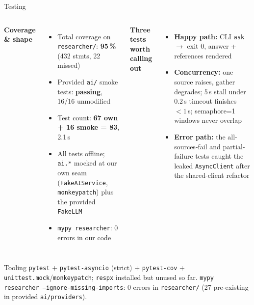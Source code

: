 \documentclass[aspectratio=169,11pt]{beamer}
\begin{document}
\begin{frame}{Testing}
  \begin{columns}[T,onlytextwidth]
  \textbf{Coverage \& shape}
  \begin{itemize}\setlength\itemsep{0.3em}
    \item Total coverage on \texttt{researcher/}: \textbf{95\,\%} (432 stmts, 22 missed)
    \item Provided \texttt{ai/} smoke tests: \textcolor{ok}{\textbf{passing}}, 16/16 unmodified
    \item Test count: \textbf{67 own + 16 smoke = 83}, 2.1\,s
    \item All tests offline; \texttt{ai.*} mocked at our own seam (\texttt{FakeAIService}, \texttt{monkeypatch}) plus the provided \texttt{FakeLLM}
    \item \texttt{mypy researcher}: 0 errors in our code
  \end{itemize}

  \textbf{Three tests worth calling out}
  \begin{itemize}\setlength\itemsep{0.3em}
    \item \textbf{Happy path:} CLI \texttt{ask} $\to$ exit 0, answer + references rendered
    \item \textbf{Concurrency:} one source raises, gather degrades; 5\,s stall under 0.2\,s timeout finishes $<1$\,s; semaphore=1 windows never overlap
    \item \textbf{Error path:} the all-sources-fail and partial-failure tests caught the leaked \texttt{AsyncClient} after the shared-client refactor
  \end{itemize}
  \end{columns}

  \vspace{0.6em}
  \begin{block}{Tooling}
    \texttt{pytest} + \texttt{pytest-asyncio} (strict) + \texttt{pytest-cov} + \texttt{unittest.mock}/\texttt{monkeypatch}; \texttt{respx} installed but unused so far. \texttt{mypy researcher --ignore-missing-imports}: 0 errors in \texttt{researcher/} (27 pre-existing in provided \texttt{ai/providers}).
  \end{block}
\end{frame}
\end{document}
